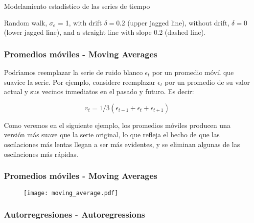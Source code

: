\documentclass[xcolor=(list of options)]{beamer}
\begin{document}
\begin{section}{Modelamiento estad\'istico de las series de tiempo}
\begin{frame}
Random walk, $\sigma_\epsilon$ = 1, with drift $\delta =0 .2$ (upper jagged line), without drift, $\delta = 0$ (lower jagged line), and a straight line with slope 0.2 (dashed line).
\end{frame}

\begin{frame}
\frametitle{Promedios m\'oviles - Moving Averages}

Podr\'\i{}amos reemplazar la serie de ruido blanco $\epsilon_t$ por un promedio m\'ovil que suavice la serie. Por ejemplo, considere reemplazar $\epsilon_t$ por un promedio de su valor actual y sus vecinos inmediatos en el pasado y futuro. Es decir:

\begin{equation*}
v_t = 1/3 (\epsilon_{t-1} + \epsilon_t + \epsilon_{t+1})
\end{equation*}

Como veremos en el siguiente ejemplo, los promedios m\'oviles producen una versi\'on m\'as suave que la serie original, lo que refleja el hecho de que las oscilaciones m\'as lentas llegan a ser m\'as evidentes, y se eliminan algunas de las oscilaciones m\'as r\'apidas. 

\end{frame}

\begin{frame}
\frametitle{Promedios m\'oviles - Moving Averages}

\begin{figure}[t!]
\texttt{[image: moving\_average.pdf]}
\end{figure}

\end{frame}

\begin{frame}
\frametitle{Autorregresiones - Autoregressions}


\end{frame}
\end{section}
\end{document}
